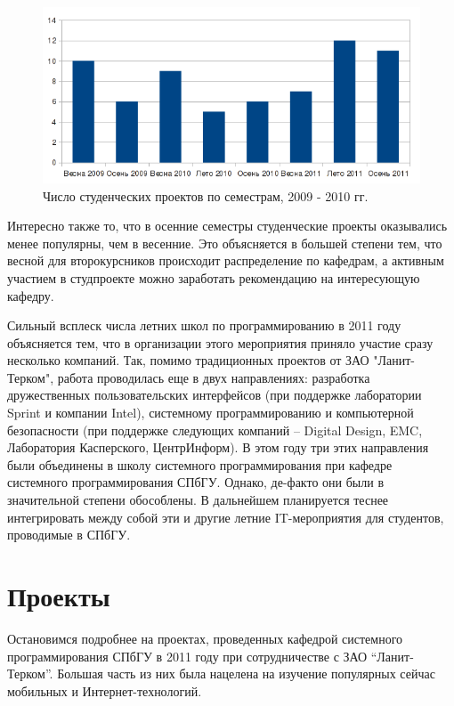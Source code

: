 \documentclass[a5paper]{article}
\begin{document}
\begin{figure} [ht]
  \begin{center}
    \includegraphics[width=1\textwidth]{01-projects.png}
    \caption{Число студенческих проектов по семестрам, 2009 - 2010 гг.}
    \label{projects}
  \end{center}
\end{figure}

Интересно также то, что в осенние семестры студенческие проекты оказывались менее популярны, чем в весенние. Это объясняется в большей степени тем, что весной для второкурсников происходит распределение по кафедрам, а активным участием в студпроекте можно заработать рекомендацию на интересующую кафедру. 

Сильный всплеск числа летних школ по программированию в 2011 году объясняется тем, что в организации этого мероприятия приняло участие сразу несколько компаний. Так, помимо традиционных проектов от ЗАО "Ланит-Терком", работа проводилась еще в двух направлениях: разработка дружественных пользовательских интерфейсов (при поддержке лаборатории Sprint и компании Intel), системному программированию и компьютерной безопасности (при поддержке следующих компаний -- Digital Design, EMC, Лаборатория Касперского, ЦентрИнформ). В этом году три этих направления были объединены в школу системного программирования при кафедре системного программирования СПбГУ. Однако, де-факто они были в значительной степени обособлены. В дальнейшем планируется теснее интегрировать между собой эти и другие летние IT-мероприятия для студентов, проводимые в СПбГУ.

\section{Проекты}

Остановимся подробнее на проектах, проведенных кафедрой системного программирования СПбГУ в 2011 году при сотрудничестве с ЗАО ``Ланит-Терком''. Большая часть из них была нацелена на изучение популярных сейчас мобильных и Интернет-технологий.
\end{document}
